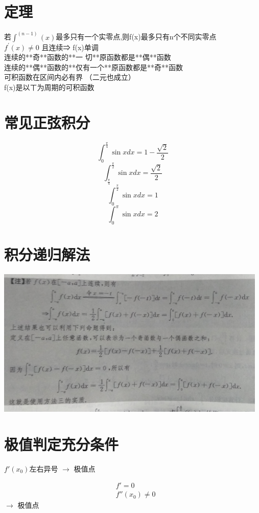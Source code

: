 \documentclass[UTF8]{ctexart}
\begin{document}
\section{定理}
​若$\int^{(n-1)}(x)$最多只有一个实零点,则f(x)最多只有n个不同实零点 \\
$f^′(x)≠0$ 且连续⇒ f(x)单调 \\
连续的**奇**函数的**一  切**原函数都是**偶**函数 \\
连续的**偶**函数的**仅有一个**原函数都是**奇**函数 \\
可积函数在区间内必有界 （二元也成立） \\
f(x)是以ㄒ为周期的可积函数 \\

\section{常见正弦积分}

$$ \int_0^\frac{\pi}{4} \sin x dx =1- \frac{\sqrt{2}}{2}$$
$$ \int_\frac{\pi}{4}^\frac{\pi}{2} \sin x dx =\frac{\sqrt{2}}{2}$$
$$ \int_0^\frac{\pi}{2} \sin x dx = 1$$
$$ \int_0^\pi \sin x dx =2$$

\section{积分递归解法}
\includegraphics[width=13cm]{9345E7/2002379869.jpg}

\section{极值判定充分条件}
$f '(x_0)$左右异号 $\rightarrow$ 极值点

\begin{align}
&f'=0 \\
&f''(x_0) \neq 0
\end{align}
$\rightarrow$ 极值点
\end{document}
